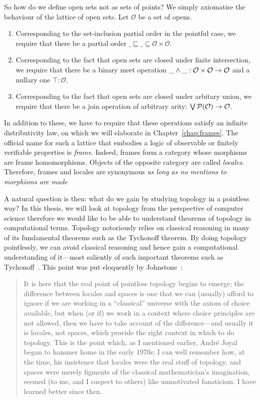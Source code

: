 So how do we define open sets not as sets of points? We simply axiomatise the behaviour of
the lattice of open sets. Let $\mathcal{O}$ be a set of opens.
\begin{enumerate}
  \item Corresponding to the set-inclusion partial order in the pointful case, we require
    that there be a partial order $\_\sqsubseteq\_ \subseteq \mathcal{O} \times \mathcal{O}$.
  \item Corresponding to the fact that open sets are closed under finite intersection, we
    require that there be a binary meet operation $\meet{\_}{\_} : \mathcal{O} \times
    \mathcal{O} \rightarrow \mathcal{O}$ and a nullary one $\top : \mathcal{O}$.
  \item Corresponding to the fact that open sets are closed under arbitary union, we
    require that there be a join operation of arbitrary arity: $\joinnm{}\_ :
    \mathcal{P}(\mathcal{O}) \rightarrow \mathcal{O}$.
\end{enumerate}
In addition to these, we have to require that these operations satisfy an infinite
distributivity law, on which we will elaborate in Chapter~\ref{chap:frames}. The official
name for such a lattice that embodies a logic of observable or finitely verifiable
properties is \emph{frame}. Indeed, frames form a category whose morphisms are frame
homomorphisms. Objects of the opposite category are called \emph{locales}. Therefore,
frames and locales are synonymous
\emph{as long as no mentions to morphisms are made}~\cite{vickers, stone-spaces}

A natural question is then: what do we gain by studying topology in a pointless way? In
this thesis, we will look at topology from the perspective of computer science therefore
we would like to be able to understand theorems of topology in computational terms.
Topology notoriously relies on classical reasoning in many of its fundamental theorems
such as the Tychonoff theorem. By doing topology pointlessly, we can avoid classical
reasoning and hence gain a computational understanding of it---most saliently of such
important theorems such as Tychonoff~\cite{coq-tychonoff}. This point was put eloquently
by Johnstone~\cite[pg.~46]{stone-spaces}:
\begin{quote}
  It is here that the real point of pointless topology begins to emerge; the difference
  between locales and spaces is one that we can (usually) afford to ignore if we are
  working in a ``classical'' universe with the axiom of choice available, but when (or if)
  we work in a context where choice principles are not allowed, then we have to take
  account of the difference—and usually it is locales, not spaces, which provide the right
  context in which to do topology. This is the point which, as I mentioned earlier,
  Andr\'{e} Joyal began to hammer home in the early 1970s; I can well remember how, at the
  time, his insistence that locales were the real stuff of topology, and spaces were
  merely figments of the classical mathematician's imagination, seemed (to me, and I
  suspect to others) like unmotivated fanaticism. I have learned better since then.
\end{quote}


